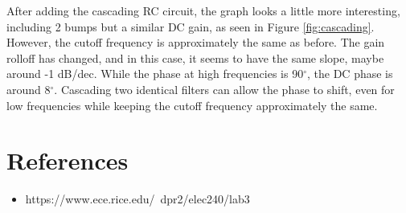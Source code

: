 \documentclass[10pt]{article}
\begin{document}
After adding the cascading RC circuit, the graph looks a little more interesting, including 2 bumps but a similar DC gain, as seen in Figure \ref{fig:cascading}. However, the cutoff frequency is approximately the same as before. The gain rolloff has changed, and in this case, it seems to have the same slope, maybe around -1 dB/dec. While the phase at high frequencies is 90$^\circ$, the DC phase is around 8$^\circ$. Cascading two identical filters can allow the phase to shift, even for low frequencies while keeping the cutoff frequency approximately the same.


\section{References}

\begin{itemize}
	\item https://www.ece.rice.edu/~dpr2/elec240/lab3
\end{itemize}

\medskip

\end{document}
